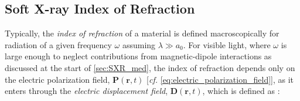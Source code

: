 \subsection{Soft X-ray Index of Refraction}\label{sec:x-ray_index}
Typically, the \emph{index of refraction} of a material is defined macroscopically for radiation of a given frequency $\omega$ assuming $\lambda \gg a_0$. 
For visible light, where $\omega$ is large enough to neglect contributions from magnetic-dipole interactions as discussed at the start of \cref{sec:SXR_med}, the index of refraction depends only on the electric polarization field, $\mathbold{P}(\mathbold{r},t)$ [\emph{cf.\@} \cref{eq:electric_polarization_field}], as it enters through the \emph{electric displacement field}, $\mathbold{D}(\mathbold{r},t)$, which is defined as \cite{Landau60,Jackson75,Griffiths17,Born80}: 
